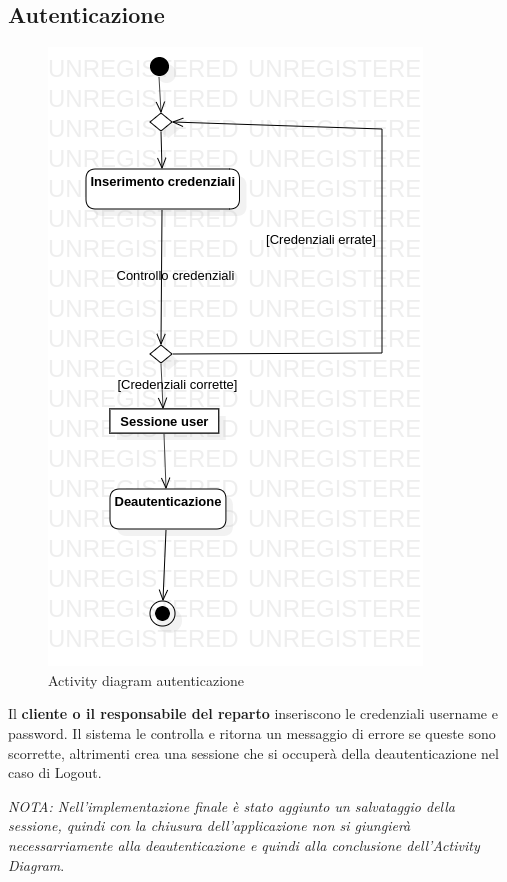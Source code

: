 \documentclass[12pt, a4paper]{article}
\begin{document}
\subsection{Autenticazione}
\begin{figure}[H]
\centering
\includegraphics{Use Case Model!Autenticazione!ActivityAutenticazione!ActivityDiagramAutenticazione_8.png}
\caption{Activity diagram autenticazione}
\end{figure}

Il \textbf{cliente o il responsabile del reparto} inseriscono le credenziali username e password.
Il sistema le controlla e ritorna un messaggio di errore se queste sono scorrette, altrimenti crea una sessione che si occuperà della deautenticazione nel caso di Logout.

\emph{NOTA: Nell'implementazione finale è stato aggiunto un salvataggio della sessione, quindi con la chiusura dell'applicazione non si giungierà necessarriamente alla deautenticazione e quindi alla conclusione dell'Activity Diagram}.
\end{document}
